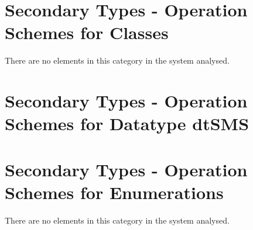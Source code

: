 

\section{Secondary Types - Operation Schemes for Classes}
There are no elements in this category in the system analysed.






\section{Secondary Types - Operation Schemes for Datatype dtSMS} 
\label{OM-CM-STDataType-dtSMS}



\section{Secondary Types - Operation Schemes for Enumerations}
There are no elements in this category in the system analysed.


